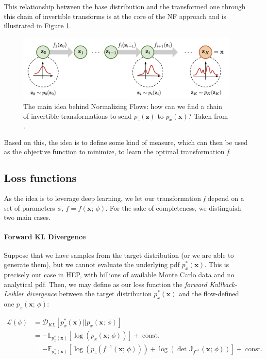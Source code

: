 This relationship between the base distribution and the transformed one through this chain of invertible transforms is at the core of the NF approach and is illustrated in Figure \ref{fig:nf}.

\begin{figure}
    \centering
    \includegraphics[width=\columnwidth]{gfx/ch4/normalizing-flow.png}
    \caption[Normalizing Flows]{The main idea behind Normalizing Flows: how can we find a chain of invertible transformations to send $p_z(\mathbf{z})$ to $p_x(\mathbf{x})$? Taken from \cite{nffig}.}
    \label{fig:nf}
\end{figure}
	
Based on this, the idea is to define some kind of measure, which can then be used as the objective function to minimize, to learn the optimal transformation \emph{f}.

\subsection{Loss functions}

As the idea is to leverage deep learning, we let our transformation \emph{f} depend on a set of parameters $\phi$, $f = f(\mathbf{x};\, \phi)$.
For the sake of completeness, we distinguish two main cases.

\paragraph{Forward KL Divergence}
Suppose that we have samples from the target distribution (or we are able to generate them), but we cannot evaluate the underlying pdf $p_x^*(\mathbf{x})$. This is precisely our case in HEP, with billions of available Monte Carlo data and no analytical pdf. Then, we may define as our loss function the \emph{forward Kullback-Leibler divergence} between the target distribution $p_x^*(\mathbf{x})$ and the flow-defined one $p_x(\mathbf{x}; \, \phi)$:

\[
\begin{aligned}
    \mathcal{L}(\phi) &= \mathcal{D}_{KL}[p_x^*(\mathbf{x})||p_x(\mathbf{x}; \, \phi)]\\
    &= -\mathbb{E}_{p_x^*(\mathbf{x})}[\log(p_x(\mathbf{x}; \, \phi))] +\; \text{const.}\\
    &= -\mathbb{E}_{p_x^*(\mathbf{x})}[\log(p_z(f^{-1}(\mathbf{x}; \, \phi)))+\log\left(\det\mathbb{J}_{f^{-1}}(\mathbf{x}; \, \phi)\right)] +\; \text{const.}
\end{aligned}
\]

